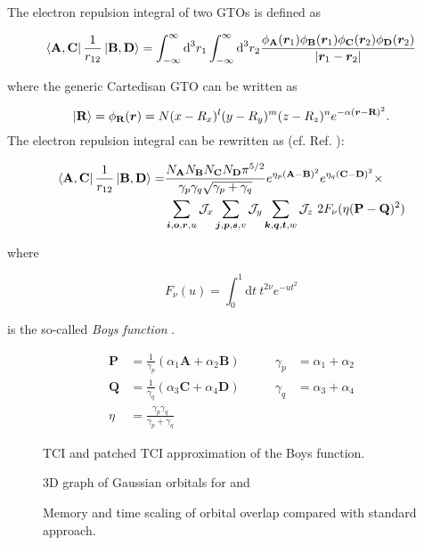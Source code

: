 The electron repulsion integral of two GTOs is defined as

\begin{equation}
    \bra{\textbf{A}, \textbf{C}}\frac{1}{r_{12}}\ket{\textbf{B}, \textbf{D}} = \int_{-\infty}^\infty \text{d}^3r_1 \int_{-\infty}^\infty \text{d}^3r_2 \frac{\phi_\textbf{A}(\bm{r}_1) \phi_\textbf{B}(\bm{r}_1) \phi_\textbf{C}(\bm{r}_2) \phi_\textbf{D}(\bm{r}_2)}{|\bm{r}_1 - \bm{r}_2|}
\end{equation}

where the generic Cartedisan GTO can be written as

\begin{equation}
    \ket{\textbf{R}} = \phi_\textbf{R}(\bm{r}) = N (x - R_x)^l (y - R_y)^m (z - R_z)^n e^{-\alpha (\bm{r} - \textbf{R})^2}.
\end{equation}
The electron repulsion integral can be rewritten as (cf. Ref. \cite{Petersson2010}): 

\begin{align}
    \bra{\textbf{A}, \textbf{C}}\frac{1}{r_{12}}\ket{\textbf{B}, \textbf{D}} =& \frac{N_\textbf{A}N_\textbf{B}N_\textbf{C}N_\textbf{D} \pi^{5/2}}{\gamma_p\gamma_q\sqrt{\gamma_p + \gamma_q}} e^{\eta_p(\textbf{A} - \textbf{B})^2} e^{\eta_q(\textbf{C} - \textbf{D})^2} \times \\
    \nonumber &\sum_{\bm{i},\bm{o},\bm{r},u}\mathcal{J}_x \sum_{\bm{j},\bm{p},\bm{s},v} \mathcal{J}_y \sum_{\bm{k},\bm{q},\bm{t},w} \mathcal{J}_z\ 2F_\nu (\eta (\textbf{P} - \textbf{Q})^2)
\end{align}

where

\begin{equation} 
    F_\nu(u) = \int_{0}^{1} \text{d}t\ t^{2\nu} e ^{-ut^2}
\end{equation}

is the so-called \textit{Boys function} \cite{Boys1950}.

    
\begin{equation}
    \begin{alignedat}{5}      
      \textbf{P} &= \frac{1}{\gamma_p}(\alpha_1 \textbf{A} + \alpha_2 \textbf{B}) &\qquad \gamma_p &= \alpha_1 + \alpha_2 \\[6pt]
      \textbf{Q} &= \frac{1}{\gamma_q}(\alpha_3 \textbf{C} + \alpha_4 \textbf{D}) &\qquad \gamma_q &= \alpha_3 + \alpha_4 \\[6pt]
      \eta &= \frac{\gamma_p\gamma_q}{\gamma_p + \gamma_q}
    \end{alignedat}
\end{equation}
    

\begin{figure}[ht!]
    \caption{TCI and patched TCI approximation of the Boys function.}
\end{figure}

\begin{figure}[ht!]
    \caption{3D graph of Gaussian orbitals for  and }
\end{figure}

\begin{figure}[ht!]
    \caption{Memory and time scaling of orbital overlap compared with standard approach. }
\end{figure}


